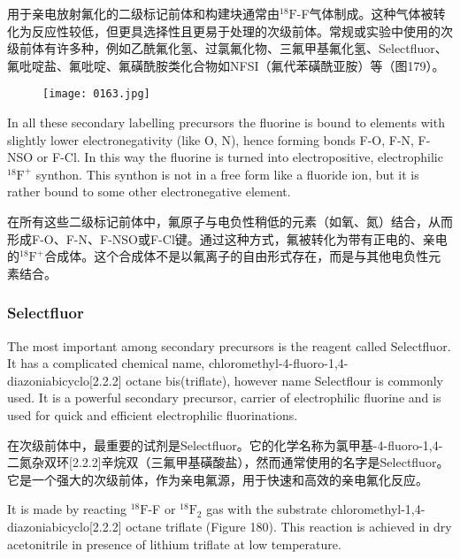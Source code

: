 \documentclass[dvipsnames, svgnames,a4paper,11pt]{article}
\begin{document}
用于亲电放射氟化的二级标记前体和构建块通常由${}^\mathrm{18}\mathrm{F}$-F气体制成。这种气体被转化为反应性较低，但更具选择性且更易于处理的次级前体。常规或实验中使用的次级前体有许多种，例如乙酰氟化氢、过氯氟化物、三氟甲基氟化氢、Selectfluor、氟吡啶盐、氟吡啶、氟磺酰胺类化合物如NFSI（氟代苯磺酰亚胺）等（图179）。

\begin{figure}[h]
	\centering
    \texttt{[image: 0163.jpg]}    
     \label{fig179}
\end{figure}

In all these secondary labelling precursors the fluorine is bound to elements with
slightly lower electronegativity (like O, N), hence forming bonds F-O, F-N, F-NSO or
F-Cl. In this way the fluorine is turned into electropositive, electrophilic {${}^\mathrm{18}\mathrm{F}^+$} synthon.
This synthon is not in a free form like a fluoride ion, but it is rather bound to some
other electronegative element.

在所有这些二级标记前体中，氟原子与电负性稍低的元素（如氧、氮）结合，从而形成F-O、F-N、F-NSO或F-Cl键。通过这种方式，氟被转化为带有正电的、亲电的{${}^\mathrm{18}\mathrm{F}^+$}合成体。这个合成体不是以氟离子的自由形式存在，而是与其他电负性元素结合。

\subsubsection{Selectfluor}
The most important among secondary precursors is the reagent called Selectfluor. It
has a complicated chemical name, chloromethyl-4-fluoro-1,4-diazoniabicyclo[2.2.2]
octane bis(triflate), however name Selectflour is commonly used. It is a powerful
secondary precursor, carrier of electrophilic fluorine and is used for quick and
efficient electrophilic fluorinations.

在次级前体中，最重要的试剂是Selectfluor。它的化学名称为氯甲基-4-fluoro-1,4-二氮杂双环[2.2.2]辛烷双（三氟甲基磺酸盐），然而通常使用的名字是Selectfluor。它是一个强大的次级前体，作为亲电氟源，用于快速和高效的亲电氟化反应。



It is made by reacting ${}^\mathrm{18}\mathrm{F}$-F or ${}^\mathrm{18}\mathrm{F}_2$ gas with the substrate chloromethyl-1,4-
diazoniabicyclo[2.2.2] octane triflate (Figure 180). This reaction is achieved in dry
acetonitrile in presence of lithium triflate at low temperature.
\end{document}
